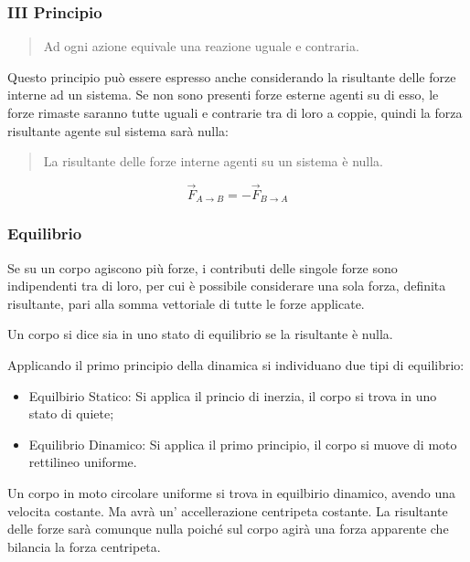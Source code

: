 \documentclass{article}
\numberwithin{equation}{subsection}
\begin{document}
\subsubsection{III Principio}

\begin{quotation}
    Ad ogni azione equivale una reazione uguale e contraria.
\end{quotation}

Questo principio può essere espresso anche considerando la risultante 
delle forze interne ad un sistema. Se non sono presenti 
forze esterne agenti su di esso, le forze rimaste saranno 
tutte uguali e contrarie tra di loro a coppie, quindi la 
forza risultante agente sul sistema sarà nulla:

\begin{quotation}
    La risultante delle forze interne agenti su un sistema è nulla.
\end{quotation}

\begin{equation}
    \vec{F}_{A\to B}=-\vec{F}_{B\to A}
\end{equation}

\subsubsection{Equilibrio}
Se su un corpo agiscono più forze, i contributi delle singole forze sono indipendenti tra di loro, per cui è possibile considerare una sola forza, definita risultante, pari 
alla somma vettoriale di tutte le forze applicate. 

Un corpo si dice sia in uno stato di equilibrio se la 
risultante è nulla. 

Applicando 
il primo principio della dinamica si individuano due tipi di 
equilibrio:
\begin{itemize}
    \item Equilbirio Statico: Si applica il princio di inerzia, 
    il corpo si trova in uno stato di quiete;
    \item Equilibrio Dinamico: Si applica il primo principio, 
    il corpo si muove di moto rettilineo uniforme.
\end{itemize}
Un corpo in moto circolare uniforme si trova in equilbirio 
dinamico, avendo una velocita costante. Ma avrà un'
accellerazione centripeta costante. La risultante delle forze sarà 
comunque nulla poiché sul corpo agirà una forza apparente che 
bilancia la forza centripeta.\\
 
\end{document}
